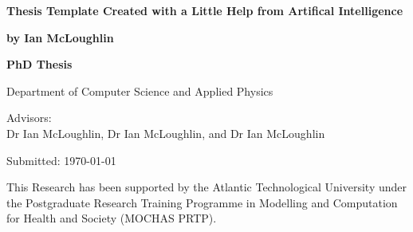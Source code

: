 \newcommand{\thesistitle}{Thesis Template Created with a Little Help from Artifical Intelligence}
\newcommand{\thesisauthor}{by Ian McLoughlin}
\newcommand{\thesisadvisor}{Advisors:\\Dr Ian McLoughlin, Dr Ian McLoughlin, and Dr Ian McLoughlin}
\newcommand{\thesistype}{PhD Thesis}
\newcommand{\thesisdate}{Submitted: \today}
\newcommand{\thesisdepartment}{Department of Computer Science and Applied Physics}
\newcommand{\thesisfunding}{This Research has been supported by the Atlantic Technological University under the Postgraduate Research Training Programme in Modelling and Computation for Health and Society (MOCHAS PRTP).}

\begin{titlingpage}
  
  {\noindent\huge\textbf{\thesistitle}\par}
  \vspace{12mm}
  {\noindent\LARGE\textbf{\thesisauthor}\par}
  \vspace{26mm}
  {\noindent\Large\textbf{\thesistype}\par}
  \vspace{2mm}
  {\noindent\Large\thesisdepartment\par}
  \vspace{2mm}
  {\noindent\Large\thesisadvisor\par}
  \vspace{2mm}
  {\noindent\Large\thesisdate\par}
  \vspace{26mm}
  {\noindent\thesisfunding\par}

  
\end{titlingpage}